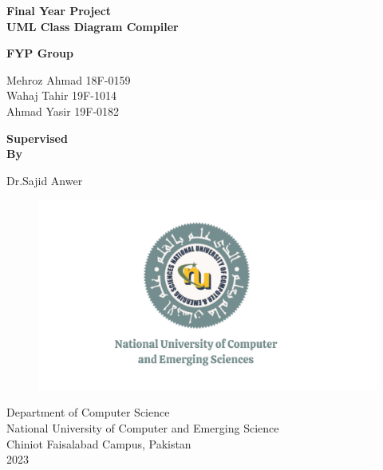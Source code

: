 \begin{Titlepage}
\begin{center}
    \vspace*{2cm}
    \textbf{\Huge  Final Year Project}\\
    \vspace*{1cm}
    \textbf{\Large  UML Class Diagram Compiler}\\
    \vspace*{1cm}
    
      \textbf{ \large FYP Group}
      \vspace{0.2cm}
      \begin{center}
           \large Mehroz Ahmad 18F-0159 \\Wahaj Tahir 19F-1014 \\Ahmad Yasir 19F-0182
      \end{center}
    
    \vspace{1.5cm}
    
    \textbf{\large Supervised \\
    \vspace{0.3cm}\large By}\\
    \vspace{0.2cm}
    \begin{center}
           \large Dr.Sajid Anwer
      \end{center}
       \vspace*{2cm}
      \begin{figure}[hb]
        \centering
        \includegraphics[scale=0.20]{Fast-Nuces.png}
    \end{figure}
    \vfill
    \vspace{0.8cm}
     Department of Computer Science\\ National University of Computer and Emerging Science\\ Chiniot Faisalabad Campus, Pakistan\\ 2023
    \end{center}

\end{Titlepage}